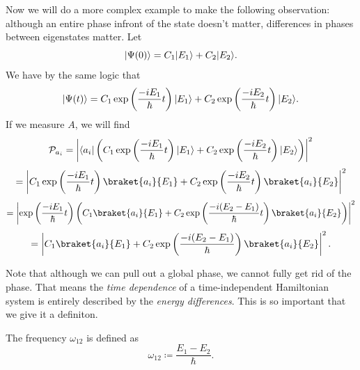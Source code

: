 Now we will do a more complex example to make the following observation: although an entire phase infront of the state doesn't matter, differences in phases between eigenstates matter. Let
\[
	\lvert\Psi (0)\rangle =C_1\lvert E_1\rangle +C_2\lvert E_2\rangle 
.\]
We have by the same logic that
\[
	\lvert\Psi (t)\rangle =C_1 \exp \left(\frac{-iE_1}{\hbar } t\right)\lvert E_1\rangle +C_2 \exp \left( \frac{-iE_2}{\hbar } t \right) \lvert E_2\rangle 
.\]
If we measure $A$, we will find
\[
	\mathcal{P}_{a_i} =\left| \langle a_i\rvert \left( C_1\exp \left( \frac{-iE_1}{\hbar } t \right) \lvert E_1\rangle +C_2\exp \left( \frac{-iE_2}{\hbar } t \right) \lvert E_2\rangle  \right)  \right| ^2
\]
\[
	=\left| C_1\exp \left( \frac{-iE_1}{\hbar } t \right) \braket{a_i}{E_1} +C_2\exp \left( \frac{-iE_2}{\hbar } t \right) \braket{a_i}{E_2}  \right| ^2
\]
\[
	=\left| \exp \left( \frac{-iE_1}{\hbar } t \right) \left( C_1\braket{a_i}{E_1} +C_2 \exp \left( \frac{-i(E_2-E_1)}{\hbar } t \right) \braket{a_i}{E_2}  \right)  \right| ^2
\]
\[
	=\left| C_1\braket{a_i}{E_1} +C_2 \exp \left( \frac{-i(E_2-E_1)}{\hbar }  \right) \braket{a_i}{E_2}  \right| ^2
.\]

Note that although we can pull out a global phase, we cannot fully get rid of the phase. That means the \emph{time dependence} of a time-independent Hamiltonian system is entirely described by the \emph{energy differences}. This is so important that we give it a definiton.

\begin{definition}[Frequency]\label{dfn:2.1}
	The frequency $\omega_{12} $ is defined as
	\[
		\omega_{12} \coloneqq \frac{E_1-E_2}{\hbar } 
	.\]
\end{definition}

